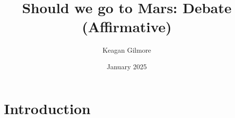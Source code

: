 \documentclass{article}
\title{Should we go to Mars: Debate (Affirmative)}
\author{Keagan Gilmore}
\date{January 2025}
\begin{document}
\maketitle

\section{Introduction}
\end{document}
